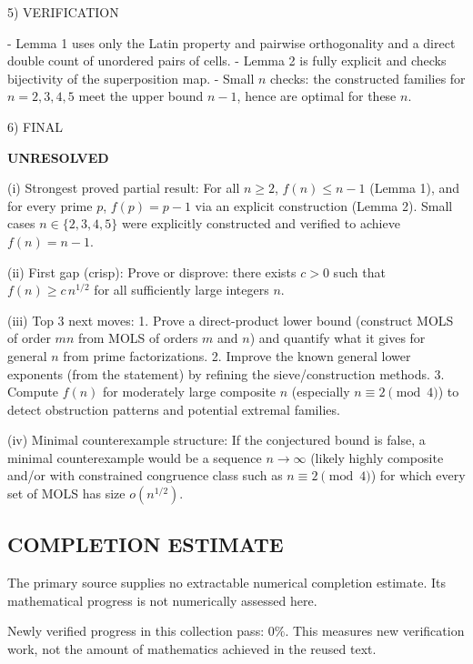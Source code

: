 5) VERIFICATION

- Lemma 1 uses only the Latin property and pairwise orthogonality and a direct double count of unordered pairs of cells.
- Lemma 2 is fully explicit and checks bijectivity of the superposition map.
- Small $n$ checks: the constructed families for $n=2,3,4,5$ meet the upper bound $n-1$, hence are optimal for these $n$.

6) FINAL

\textbf{UNRESOLVED}

(i) Strongest proved partial result: For all $n\ge 2$, $f(n)\le n-1$ (Lemma 1), and for every prime $p$, $f(p)=p-1$ via an explicit construction (Lemma 2). Small cases $n\in\{2,3,4,5\}$ were explicitly constructed and verified to achieve $f(n)=n-1$.

(ii) First gap (crisp): Prove or disprove: there exists $c>0$ such that $f(n)\ge c\,n^{1/2}$ for all sufficiently large integers $n$.

(iii) Top 3 next moves:
  1. Prove a direct-product lower bound (construct MOLS of order $mn$ from MOLS of orders $m$ and $n$) and quantify what it gives for general $n$ from prime factorizations.
  2. Improve the known general lower exponents (from the statement) by refining the sieve/construction methods.
  3. Compute $f(n)$ for moderately large composite $n$ (especially $n\equiv 2\pmod 4$) to detect obstruction patterns and potential extremal families.

(iv) Minimal counterexample structure: If the conjectured bound is false, a minimal counterexample would be a sequence $n\to\infty$ (likely highly composite and/or with constrained congruence class such as $n\equiv 2\pmod 4$) for which every set of MOLS has size $o(n^{1/2})$.




\subsection*{COMPLETION ESTIMATE}
The primary source supplies no extractable numerical completion estimate. Its mathematical progress is not numerically assessed here.

Newly verified progress in this collection pass: $0\%$. This measures new verification work, not the amount of mathematics achieved in the reused text.
